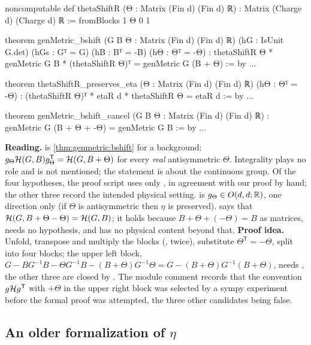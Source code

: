 \begin{leanbox}
\begin{leancode}
noncomputable def thetaShiftR (Θ : Matrix (Fin d) (Fin d) ℝ) :
    Matrix (Charge d) (Charge d) ℝ :=
  fromBlocks 1 Θ 0 1

theorem genMetric_bshift (G B Θ : Matrix (Fin d) (Fin d) ℝ)
    (hG : IsUnit G.det) (hGs : Gᵀ = G) (hB : Bᵀ = -B) (hΘ : Θᵀ = -Θ) :
    thetaShiftR Θ * genMetric G B * (thetaShiftR Θ)ᵀ
      = genMetric G (B + Θ) := by ...

theorem thetaShiftR_preserves_eta (Θ : Matrix (Fin d) (Fin d) ℝ)
    (hΘ : Θᵀ = -Θ) :
    (thetaShiftR Θ)ᵀ * etaR d * thetaShiftR Θ = etaR d := by ...

theorem genMetric_bshift_cancel (G B Θ : Matrix (Fin d) (Fin d) ℝ) :
    genMetric G (B + Θ + -Θ) = genMetric G B := by ...
\end{leancode}
\textbf{Reading.}  is \cref{thm:genmetric:bshift} for a background:
$g_\Theta\mathcal{H}(G,B)g_\Theta^{\mathsf T}=\mathcal{H}(G,B+\Theta)$ for every \emph{real} antisymmetric
$\Theta$. Integrality plays no role and is not mentioned; the statement is about the
continuous group. Of the four hypotheses, the proof script uses only , in
agreement with our proof by hand; the other three record the intended physical setting.
 is $g_\Theta\in O(d,d;\mathbb{R})$, one direction only (if
$\Theta$ is antisymmetric then $\eta$ is preserved).  says
that $\mathcal{H}(G,B+\Theta-\Theta)=\mathcal{H}(G,B)$; it holds because $B+\Theta+(-\Theta)=B$ as
matrices, needs no hypothesis, and has no physical content beyond that.
\textbf{Proof idea.} Unfold, transpose and multiply the blocks
(,  twice), substitute
$\Theta^{\mathsf T}=-\Theta$, split into four blocks; the upper left block,
$G-BG^{-1}B-\Theta G^{-1}B-(B+\Theta)G^{-1}\Theta=G-(B+\Theta)G^{-1}(B+\Theta)$, needs
, the other three are closed by . The module comment records
that the convention $g\mathcal{H} g^{\mathsf T}$ with $+\Theta$ in the upper right block was
selected by a sympy experiment before the formal proof was attempted, the three other
candidates being false.
\end{leanbox}

\subsection{An older formalization of \texorpdfstring{$\eta$}{eta}}

